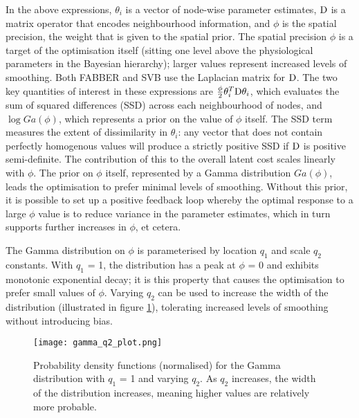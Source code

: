 In the above expressions, $\theta_i$ is a vector of node-wise parameter estimates, $\mathrm{D}$ is a matrix operator that encodes neighbourhood information, and $\phi$ is the spatial precision, the weight that is given to the spatial prior. The spatial precision $\phi$ is a target of the optimisation itself (sitting one level above the physiological parameters in the Bayesian hierarchy); larger values represent increased levels of smoothing. Both FABBER and SVB use the Laplacian matrix for $\mathrm{D}$. The two key quantities of interest in these expressions are $\frac{\phi}{2}\theta_i^T\mathrm{D}\theta_i$, which evaluates the sum of squared differences (SSD) across each neighbourhood of nodes, and $\log{Ga(\phi)}$, which represents a prior on the value of $\phi$ itself. The SSD term measures the extent of dissimilarity in $\theta_i$: any vector that does not contain perfectly homogenous values will produce a strictly positive SSD if $\mathrm{D}$ is positive semi-definite. The contribution of this to the overall latent cost scales linearly with $\phi$. The prior on $\phi$ itself, represented by a Gamma distribution $Ga(\phi)$, leads the optimisation to prefer minimal levels of smoothing. Without this prior, it is possible to set up a positive feedback loop whereby the optimal response to a large $\phi$ value is to reduce variance in the parameter estimates, which in turn supports further increases in $\phi$, et cetera. 

The Gamma distribution on $\phi$ is parameterised by location $q_1$ and scale $q_2$ constants. With $q_1$ = 1, the distribution has a peak at $\phi$ = 0 and exhibits monotonic exponential decay; it is this property that causes the optimisation to prefer small values of $\phi$. Varying $q_2$ can be used to increase the width of the distribution (illustrated in figure \ref{gamma_q2_plot}), tolerating increased levels of smoothing without introducing bias. 

\begin{figure}
\centering
\texttt{[image: gamma\_q2\_plot.png]}
\caption{Probability density functions (normalised) for the Gamma distribution with $q_1$ = 1 and varying $q_2$. As $q_2$ increases, the width of the distribution increases, meaning higher values are relatively more probable.}
\label{gamma_q2_plot} 
\end{figure}

